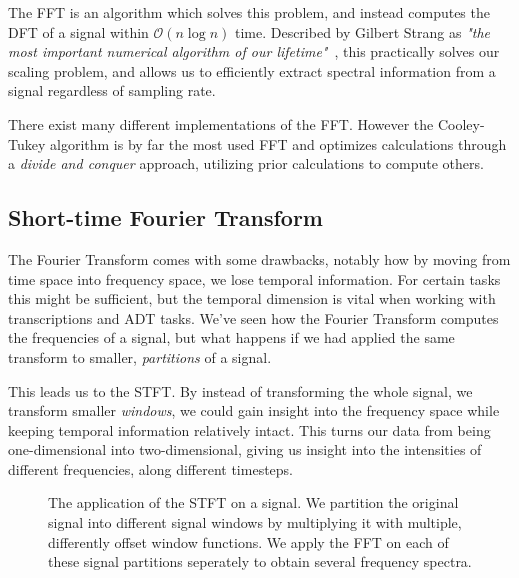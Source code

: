 The \gls{FFT} is an algorithm which solves this problem, and instead computes the \gls{DFT} of a signal within $\mathcal{O}(n\log{n})$ time. Described by Gilbert Strang as \textit{"the most important numerical algorithm of our lifetime"}~\cite{strang1993wavelet}, this practically solves our scaling problem, and allows us to efficiently extract spectral information from a signal regardless of sampling rate.

There exist many different implementations of the \gls{FFT}. However the Cooley-Tukey algorithm is by far the most used \gls{FFT} and optimizes calculations through a \textit{divide and conquer} approach, utilizing prior calculations to compute others.~\cite{d3ea2d52-5ab2-3128-8b80-efb85267295d}

\subsection{Short-time Fourier Transform}

The Fourier Transform comes with some drawbacks, notably how by moving from time space into frequency space, we lose temporal information. For certain tasks this might be sufficient, but the temporal dimension is vital when working with transcriptions and \gls{ADT} tasks. We've seen how the Fourier Transform computes the frequencies of a signal, but what happens if we had applied the same transform to smaller, \textit{partitions} of a signal.

This leads us to the \gls{STFT}. By instead of transforming the whole signal, we transform smaller \textit{windows}, we could gain insight into the frequency space while keeping temporal information relatively intact. This turns our data from being one-dimensional into two-dimensional, giving us insight into the intensities of different frequencies, along different timesteps.

\begin{figure}[H]
    \centering
    
    \caption{The application of the \gls{STFT} on a signal. We partition the original signal into different signal windows by multiplying it with multiple, differently offset window functions. We apply the \gls{FFT} on each of these signal partitions seperately to obtain several frequency spectra.}
    \label{STFTFigure}
\end{figure}

